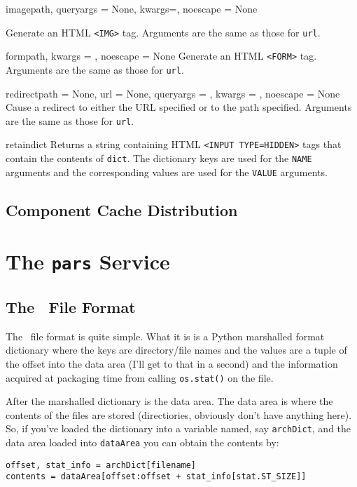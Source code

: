 \documentclass{manual}
\begin{document}
\begin{funcdesc}{image}{path, queryargs = None, kwargs={}, noescape = None}

Generate an HTML \texttt{<IMG>} tag.  Arguments are the same as those
for \texttt{url}.
\end{funcdesc}


\begin{funcdesc}{form}{path, kwargs = {}, noescape = None}
Generate an HTML \texttt{<FORM>} tag.  Arguments are the same as those
for \texttt{url}.
\end{funcdesc}


\begin{funcdesc}{redirect}{path = None, url = None, queryargs = {},
kwargs = {}, noescape = None} 
Cause a redirect to either the URL specified or to the path specified.
Arguments are the same as those for \texttt{url}.  
\end{funcdesc}

\begin{funcdesc}{retain}{dict}
Returns a string containing HTML \texttt{<INPUT TYPE=HIDDEN>} tags
that contain the contents of \texttt{dict}.  The dictionary keys are
used for the \texttt{NAME} arguments and the corresponding values are
used for the \texttt{VALUE} arguments.
\end{funcdesc}


\section{Component Cache Distribution}
\label{ccdist}

\chapter{The \texttt{pars} Service}

\section{The \PAR\ File Format}
The \PAR\ file format is quite simple.  What it is is a Python
marshalled format dictionary where the keys are directory/file names
and the values are a tuple of the offset into the data area (I'll get
to that in a second) and the information acquired at packaging time
from calling \texttt{os.stat()} on the file.

After the marshalled dictionary is the data area.  The data area is
where the contents of the files are stored (directiories, obviously
don't have anything here).  So, if you've loaded the dictionary into a
variable named, say \texttt{archDict}, and the data area loaded into
\texttt{dataArea} you can obtain the contents by:
\begin{verbatim}
offset, stat_info = archDict[filename]
contents = dataArea[offset:offset + stat_info[stat.ST_SIZE]]
\end{verbatim}
\end{document}
